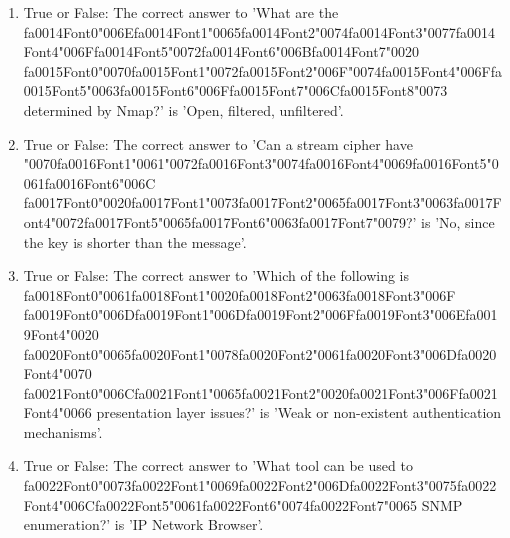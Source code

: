 \documentclass[12pt]{article}
\begin{document}
\begin{enumerate}[label=\arabic*.]
\item True or False: The correct answer to 'What are the {\csname fa0014Font0\endcsname\char"006E}{\csname fa0014Font1\endcsname\char"0065}{\csname fa0014Font2\endcsname\char"0074}{\csname fa0014Font3\endcsname\char"0077}{\csname fa0014Font4\endcsname\char"006F}{\csname fa0014Font5\endcsname\char"0072}{\csname fa0014Font6\endcsname\char"006B}{\csname fa0014Font7\endcsname\char"0020} {\csname fa0015Font0\endcsname\char"0070}{\csname fa0015Font1\endcsname\char"0072}{\csname fa0015Font2\endcsname\char"006F}{\char"0074}{\csname fa0015Font4\endcsname\char"006F}{\csname fa0015Font5\endcsname\char"0063}{\csname fa0015Font6\endcsname\char"006F}{\csname fa0015Font7\endcsname\char"006C}{\csname fa0015Font8\endcsname\char"0073} determined by Nmap?' is 'Open, filtered, unfiltered'.
\item True or False: The correct answer to 'Can a stream cipher have {\char"0070}{\csname fa0016Font1\endcsname\char"0061}{\char"0072}{\csname fa0016Font3\endcsname\char"0074}{\csname fa0016Font4\endcsname\char"0069}{\csname fa0016Font5\endcsname\char"0061}{\csname fa0016Font6\endcsname\char"006C} {\csname fa0017Font0\endcsname\char"0020}{\csname fa0017Font1\endcsname\char"0073}{\csname fa0017Font2\endcsname\char"0065}{\csname fa0017Font3\endcsname\char"0063}{\csname fa0017Font4\endcsname\char"0072}{\csname fa0017Font5\endcsname\char"0065}{\csname fa0017Font6\endcsname\char"0063}{\csname fa0017Font7\endcsname\char"0079}?' is 'No, since the key is shorter than the message'.
\item True or False: The correct answer to 'Which of the following is {\csname fa0018Font0\endcsname\char"0061}{\csname fa0018Font1\endcsname\char"0020}{\csname fa0018Font2\endcsname\char"0063}{\csname fa0018Font3\endcsname\char"006F} {\csname fa0019Font0\endcsname\char"006D}{\csname fa0019Font1\endcsname\char"006D}{\csname fa0019Font2\endcsname\char"006F}{\csname fa0019Font3\endcsname\char"006E}{\csname fa0019Font4\endcsname\char"0020} {\csname fa0020Font0\endcsname\char"0065}{\csname fa0020Font1\endcsname\char"0078}{\csname fa0020Font2\endcsname\char"0061}{\csname fa0020Font3\endcsname\char"006D}{\csname fa0020Font4\endcsname\char"0070} {\csname fa0021Font0\endcsname\char"006C}{\csname fa0021Font1\endcsname\char"0065}{\csname fa0021Font2\endcsname\char"0020}{\csname fa0021Font3\endcsname\char"006F}{\csname fa0021Font4\endcsname\char"0066} presentation layer issues?' is 'Weak or non-existent authentication mechanisms'.
\item True or False: The correct answer to 'What tool can be used to {\csname fa0022Font0\endcsname\char"0073}{\csname fa0022Font1\endcsname\char"0069}{\csname fa0022Font2\endcsname\char"006D}{\csname fa0022Font3\endcsname\char"0075}{\csname fa0022Font4\endcsname\char"006C}{\csname fa0022Font5\endcsname\char"0061}{\csname fa0022Font6\endcsname\char"0074}{\csname fa0022Font7\endcsname\char"0065} SNMP enumeration?' is 'IP Network Browser'.

\end{enumerate}
\end{document}
